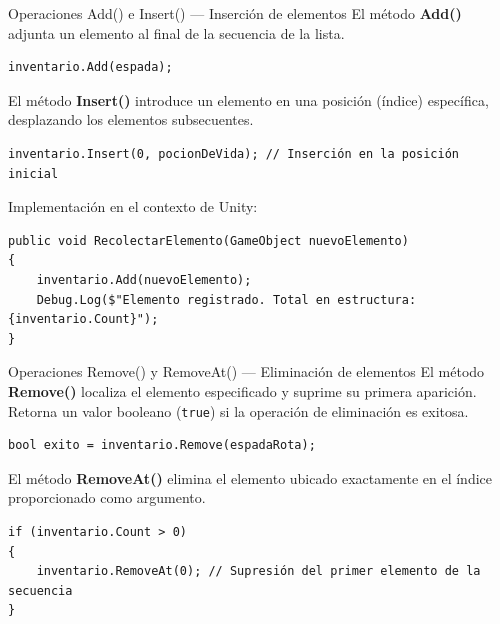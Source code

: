 \documentclass{beamer}
\begin{document}
\begin{frame}[fragile]{Operaciones Add() e Insert() — Inserción de elementos}
El método \textbf{Add()} adjunta un elemento al final de la secuencia de la lista.
\begin{lstlisting}[style=CSharpStyle]
inventario.Add(espada);
\end{lstlisting}

El método \textbf{Insert()} introduce un elemento en una posición (índice) específica, desplazando los elementos subsecuentes.
\begin{lstlisting}[style=CSharpStyle]
inventario.Insert(0, pocionDeVida); // Inserción en la posición inicial
\end{lstlisting}

Implementación en el contexto de Unity:
\begin{lstlisting}[style=CSharpStyle]
public void RecolectarElemento(GameObject nuevoElemento)
{
    inventario.Add(nuevoElemento);
    Debug.Log($"Elemento registrado. Total en estructura: {inventario.Count}");
}
\end{lstlisting}
\end{frame}

\begin{frame}[fragile]{Operaciones Remove() y RemoveAt() — Eliminación de elementos}
El método \textbf{Remove()} localiza el elemento especificado y suprime su primera aparición. Retorna un valor booleano (\texttt{true}) si la operación de eliminación es exitosa.
\begin{lstlisting}[style=CSharpStyle]
bool exito = inventario.Remove(espadaRota);
\end{lstlisting}

El método \textbf{RemoveAt()} elimina el elemento ubicado exactamente en el índice proporcionado como argumento.
\begin{lstlisting}[style=CSharpStyle]
if (inventario.Count > 0)
{
    inventario.RemoveAt(0); // Supresión del primer elemento de la secuencia
}
\end{lstlisting}
\end{frame}
\end{document}
